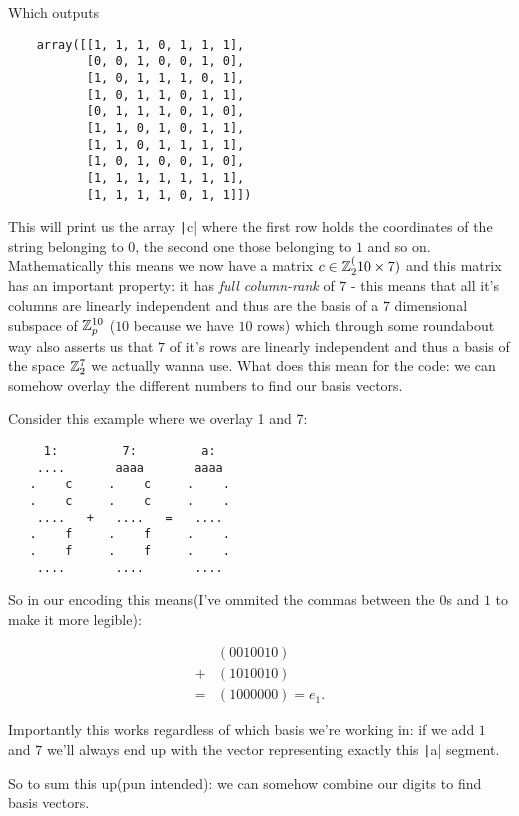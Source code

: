 \documentclass[a4paper,11pt]{article}
\begin{document}
Which outputs

\begin{verbatim}
    array([[1, 1, 1, 0, 1, 1, 1],
           [0, 0, 1, 0, 0, 1, 0],
           [1, 0, 1, 1, 1, 0, 1],
           [1, 0, 1, 1, 0, 1, 1],
           [0, 1, 1, 1, 0, 1, 0],
           [1, 1, 0, 1, 0, 1, 1],
           [1, 1, 0, 1, 1, 1, 1],
           [1, 0, 1, 0, 0, 1, 0],
           [1, 1, 1, 1, 1, 1, 1],
           [1, 1, 1, 1, 0, 1, 1]])
\end{verbatim}

This will print us the array \texttt|c| where the first row holds the coordinates of the string belonging to $0$, the second one those belonging to $1$ and so on. Mathematically this means we now have a matrix $c \in \mathbb{Z}_2^(10 \times 7)$ and this matrix has an important property: it has \emph{full column-rank} of $7$ - this means that all it's columns are linearly independent and thus are the basis of a $7$ dimensional subspace of $\mathbb{Z}_p^{10}$ ($10$ because we have $10$ rows) which through some roundabout way also asserts us that $7$ of it's rows are linearly independent and thus a basis of the space $\mathbb{Z}_2^7$ we actually wanna use. What does this mean for the code: we can somehow overlay the different numbers to find our basis vectors.

Consider this example where we overlay 1 and 7:

\begin{verbatim}
     1:         7:         a:
    ....       aaaa       aaaa    
   .    c     .    c     .    .   
   .    c     .    c     .    .   
    ....   +   ....   =   ....    
   .    f     .    f     .    .   
   .    f     .    f     .    .   
    ....       ....       ....    
\end{verbatim}

So in our encoding this means(I've ommited the commas between the $0$s and $1$ to make it more legible):

\begin{align*}
      & (0 0 1 0 0 1 0)        \\
    + & (1 0 1 0 0 1 0)        \\
    = & (1 0 0 0 0 0 0) = e_1.
\end{align*}

Importantly this works regardless of which basis we're working in: if we add $1$ and $7$ we'll always end up with the vector representing exactly this \texttt|a| segment.

So to sum this up(pun intended): we can somehow combine our digits to find basis vectors.
\end{document}
